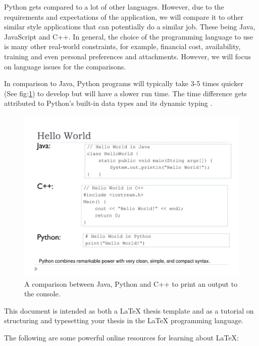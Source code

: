 	
	Python gets compared to a lot of other languages. However, due to the requirements and expectations of the application, we will compare it to other similar style applications that can potentially do a similar job. These being Java, JavaScript and C++. In general, the choice of the programming language to use is many other real-world constraints, for example, financial cost, availability, training and even personal preferences and attachments. However, we will focus on language issues for the comparisons.
	
	In comparison to Java, Python programs will typically take 3-5 times quicker (See fig:\ref{fig:py_java_c++}) to develop but will have a slower run time. The time difference gets attributed to Python's built-in data types and its dynamic typing \cite{python_comparison}.  
	
	
	\begin{figure}[h!]
		\includegraphics[width=15cm]{graphics/python_vs_java_vs_c++.jpg}
		\caption{A comparison between Java, Python and C++ to print an output to the console. \cite{py_ja_c++}}
		\label{fig:py_java_c++}
	\end{figure}
	
	
	
	
	This document is intended as both a LaTeX thesis template and as a tutorial on structuring and typesetting your thesis in the LaTeX programming language.
	
	The following are some powerful online resources for learning about LaTeX:
	
